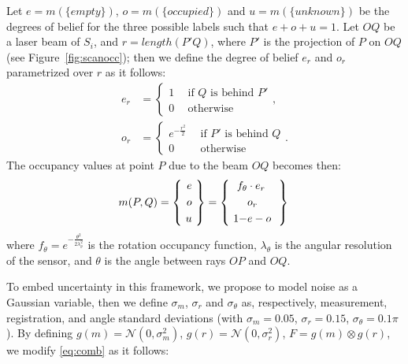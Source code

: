 Let  $e = m(\{empty\})$, $o = m(\{occupied\})$ and $u = m(\{unknown\})$ be the degrees of belief for the three possible labels such that $e + o + u = 1$. 
Let $OQ$ be a laser beam of $S_i$, and $r = length(P'Q)$, where $P'$ is the projection of $P$ on $OQ$ (see Figure~\ref{fig:scanocc}); then we define the degree of belief $e_r$ and $o_r$ parametrized over $r$ as it follows:
\begin{align}
\label{eq:occ}
 e_r &=  \begin{cases}
               1 \ \ & \text{if $Q$ is behind $P'$}\\
               0 \ \ & \text{otherwise}
         \end{cases},\\
\label{eq:occ_2}
o_r &=  \begin{cases}
      e^{-\frac{r^2}{2}} \ \ & \text{if $P'$ is behind $Q$}\\
      0 \ \ & \text{otherwise}
        \end{cases}.
\end{align}
The occupancy values at point $P$ due to the beam $OQ$ becomes then:
\begin{equation}
\label{eq:comb}
 m(P,Q)=\left\{\  \begin{aligned}
                 e\\o\\u
                 \end{aligned}
\  \right\} = \left\{\  \begin{aligned}
                     f_\theta&\cdot e_r \ \\
                     &o_r \ \\
                     1 - &e - o \ 
                    \end{aligned}
\ \right\}\\
\end{equation}
where $f_\theta = e^{-\frac{\theta^2}{2\lambda_\theta^2}}$ is the rotation occupancy function, $\lambda_\theta$ is the angular resolution of the sensor, and $\theta$ is the angle between rays $OP$ and $OQ$.


To embed uncertainty in this framework, we propose to model noise as a Gaussian variable, then we define $\sigma_m$, $\sigma_r$ and $\sigma_\theta$ as, respectively, measurement, registration, and angle standard deviations (with $\sigma_m=0.05$, $\sigma_r=0.15$, $\sigma_{\theta}=0.1\pi$). 
By defining  $g(m) = \mathcal{N}(0, \sigma_m^2)$, $g(r) = \mathcal{N}(0, \sigma_r^2)$, $F = g(m)\otimes g(r)$, we modify \eqref{eq:comb} as it follows:

